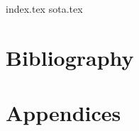 \documentclass[twoside]{report}
\begin{document}
\pagestyle{empty} %


\cleardoublepage
%
\cleardoublepage
%
\cleardoublepage
{}
\pagestyle{fancy} %

\setcounter{tocdepth}{1}
\tableofcontents

\pagebreak



{index.tex}
{sota.tex}



\begingroup
	\part{Bibliography}
	
	\renewcommand{\addcontentsline}[3]{}%
	\renewcommand{\section}[2]{}%
	\renewcommand{\chapter}[2]{}%
	
	\label{biblo:mybiblio}
\endgroup

\appendix
	\part{Appendices}

\end{document}
